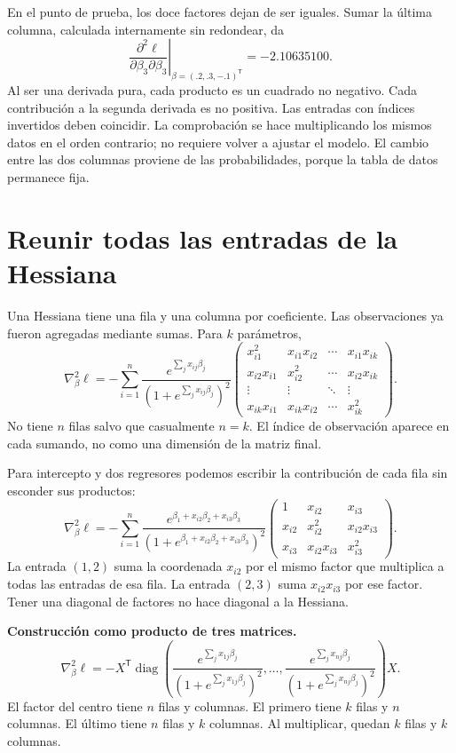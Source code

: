 \documentclass[11pt,a4paper]{article}
\newcommand{\T}{^{\mathsf T}}
\DeclareMathOperator{\diag}{diag}
\begin{document}
En el punto de prueba, los doce factores dejan de ser iguales.
Sumar la última columna, calculada internamente sin redondear, da
\[
\left.\frac{\partial^2\ell}{\partial\beta_3\partial\beta_3}\right|_{\beta=(.2,.3,-.1)\T}=-2.10635100.
\]
Al ser una derivada pura, cada producto es un cuadrado no negativo. Cada contribución a la segunda derivada es no positiva.
Las entradas con índices invertidos deben coincidir.
La comprobación se hace multiplicando los mismos datos en el orden
contrario; no requiere volver a ajustar el modelo.
El cambio entre las dos columnas proviene de las probabilidades,
porque la tabla de datos permanece fija.

\clearpage
\section{Reunir todas las entradas de la Hessiana}\label{logit28}
Una Hessiana tiene una fila y una columna por coeficiente.
Las observaciones ya fueron agregadas mediante sumas.
Para $k$ parámetros,
\[
\nabla_\beta^2\ell=
-\sum_{i=1}^n
\frac{e^{\sum_jx_{ij}\beta_j}}{(1+e^{\sum_jx_{ij}\beta_j})^2}
\begin{pmatrix}
x_{i1}^2&x_{i1}x_{i2}&\cdots&x_{i1}x_{ik}\\
x_{i2}x_{i1}&x_{i2}^2&\cdots&x_{i2}x_{ik}\\
\vdots&\vdots&\ddots&\vdots\\
x_{ik}x_{i1}&x_{ik}x_{i2}&\cdots&x_{ik}^2
\end{pmatrix}.
\]
No tiene $n$ filas salvo que casualmente $n=k$.
El índice de observación aparece en cada sumando, no como una
dimensión de la matriz final.

Para intercepto y dos regresores podemos escribir la contribución
de cada fila sin esconder sus productos:
\[
\nabla_\beta^2\ell=
-\sum_{i=1}^n
\frac{e^{\beta_1+x_{i2}\beta_2+x_{i3}\beta_3}}
{(1+e^{\beta_1+x_{i2}\beta_2+x_{i3}\beta_3})^2}
\begin{pmatrix}
1&x_{i2}&x_{i3}\\
x_{i2}&x_{i2}^2&x_{i2}x_{i3}\\
x_{i3}&x_{i2}x_{i3}&x_{i3}^2
\end{pmatrix}.
\]
La entrada $(1,2)$ suma la coordenada $x_{i2}$ por el mismo factor
que multiplica a todas las entradas de esa fila.
La entrada $(2,3)$ suma $x_{i2}x_{i3}$ por ese factor.
Tener una diagonal de factores no hace diagonal a la Hessiana.

\textbf{Construcción como producto de tres matrices.}
\[
\nabla_\beta^2\ell=
-X\T\diag\left(
\frac{e^{\sum_jx_{1j}\beta_j}}{(1+e^{\sum_jx_{1j}\beta_j})^2},
\ldots,
\frac{e^{\sum_jx_{nj}\beta_j}}{(1+e^{\sum_jx_{nj}\beta_j})^2}
\right)X.
\]
El factor del centro tiene $n$ filas y columnas.
El primero tiene $k$ filas y $n$ columnas.
El último tiene $n$ filas y $k$ columnas.
Al multiplicar, quedan $k$ filas y $k$ columnas.
\end{document}
